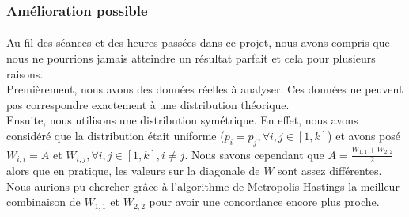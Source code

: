 \subsubsection*{Amélioration possible}
\paragraph*{}
Au fil des séances et des heures passées dans ce projet, nous avons compris que nous ne pourrions jamais 
atteindre un résultat parfait et cela pour plusieurs raisons. \\
Premièrement, nous avons des données réelles à analyser. Ces données ne peuvent pas correspondre exactement
à une distribution théorique. \\
Ensuite, nous utilisons une distribution symétrique. En effet, nous avons considéré que la distribution
était uniforme ($p_i = p_j ,\forall i,j \in[1,k]$) et avons posé $W_{i,i}=A$ et $W_{i,j},\forall i,j \in [1,k] ,i \ne j$.
Nous savons cependant que $A = \frac{W_{1,1}+W_{2,2}}{2}$ alors que en pratique, les valeurs sur la diagonale de $W$
sont assez différentes. Nous aurions pu chercher grâce à l'algorithme de Metropolis-Hastings la meilleur combinaison de 
$W_{1,1}$ et $W_{2,2}$ pour avoir une concordance encore plus proche. 